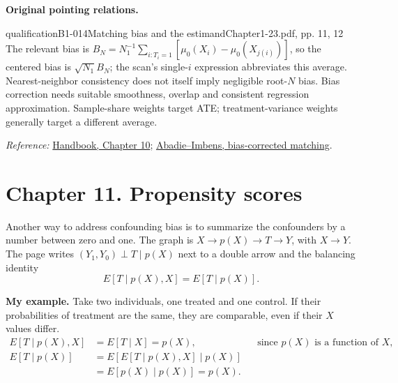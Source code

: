 {\par{}\smallskip\textbf{Original pointing relations.}\par\smallskip
{}
\begin{reviewnote}{qualification}{B1-014}{Matching bias and the estimand}{Chapter1-23.pdf, pp. 11, 12}
The relevant bias is $B_N=N_1^{-1}\sum_{i:T_i=1}[\mu_0(X_i)-\mu_0(X_{j(i)})]$, so the centered bias is $\sqrt{N_1}B_N$; the scan's single-$i$ expression abbreviates this average. Nearest-neighbor consistency does not itself imply negligible root-$N$ bias. Bias correction needs suitable smoothness, overlap and consistent regression approximation. Sample-share weights target ATE; treatment-variance weights generally target a different average.
\par\smallskip\textit{Reference:} \href{https://matheusfacure.github.io/python-causality-handbook/10-Matching.html}{Handbook, Chapter 10}; \href{https://www.nber.org/papers/t0283}{Abadie--Imbens, bias-corrected matching}.
\end{reviewnote}
\section{Chapter 11. Propensity scores}
Another way to address confounding bias is to summarize the confounders by a number between zero and one. The graph is $X\to p(X)\to T\to Y$, with $X\to Y$. The page writes $(Y_1,Y_0)\perp T\mid p(X)$ next to a double arrow and the balancing identity
\[E[T\mid p(X),X]=E[T\mid p(X)].\]


\textbf{My example.} Take two individuals, one treated and one control. If their probabilities of treatment are the same, they are comparable, even if their $X$ values differ.
\begin{align*}
E[T\mid p(X),X]&=E[T\mid X]=p(X), &&\text{since }p(X)\text{ is a function of }X,\\
E[T\mid p(X)]&=E[E[T\mid p(X),X]\mid p(X)]\\
&=E[p(X)\mid p(X)]=p(X).
\end{align*}

}
